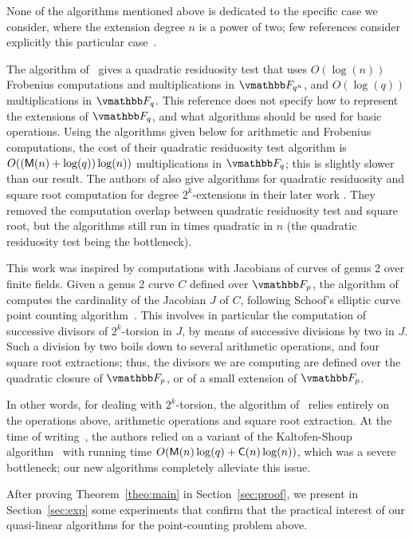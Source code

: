 None of the algorithms mentioned above is dedicated to the specific
case we consider, where the extension degree $n$ is a power of two;
few references consider explicitly this particular 
case~\cite{FeNoMo03, FeNoMo05}. 

The algorithm of~\cite{FeNoMo03} gives a quadratic residuosity test
that uses $O(\log(n))$ Frobenius computations and multiplications in
$\F_{q^n}$, and $O(\log(q))$ multiplications in $\F_q$. This reference
does not specify how to represent the extensions of $\F_q$, and what
algorithms should be used for basic operations.  Using the algorithms
given below for arithmetic and Frobenius computations, the cost of
their quadratic residuosity test algorithm is $O((\mathsf{M}(n) +
\log(q))\log(n))$ multiplications in $\F_q$; this is slightly slower
than our result.  The authors of \cite{FeNoMo03} also give algorithms
for quadratic residuosity and square root computation for degree
$2^k$-extensions in their later work \cite{FeNoMo05}. They removed the
computation overlap between quadratic residuosity test and square
root, but the algorithms still run in times quadratic in $n$ (the
quadratic residuosity test being the bottleneck).

\medskip

This work was inspired by computations with Jacobians of curves of
genus 2 over finite fields. Given a genus 2 curve $C$ defined over
$\F_p$, the algorithm of~\cite{GaSc12} computes the cardinality of the
Jacobian $J$ of $C$, following Schoof's elliptic curve point counting
algorithm~\cite{Schoof85}. This involves in particular the computation
of successive divisors of $2^k$-torsion in $J$, by means of successive
divisions by two in $J$. Such a division by two boils down to several
arithmetic operations, and four square root extractions; thus, the
divisors we are computing are defined over the quadratic closure of
$\F_p$, or of a small extension of $\F_p$.

In other words, for dealing with $2^k$-torsion, the algorithm
of~\cite{GaSc12} relies entirely on the operations above, arithmetic
operations and square root extraction. At the time of
writing~\cite{GaSc12}, the authors relied on a variant of the
Kaltofen-Shoup algorithm~\cite{KaltofenShoup1997} with running time
$O(\mathsf{M}(n)\log(q) + \mathsf{C}(n)\log(n))$, which was a severe bottleneck; our
new algorithms completely alleviate this issue.

\medskip

After proving Theorem~\ref{theo:main} in Section~\ref{sec:proof}, we
present in Section~\ref{sec:exp} some experiments that confirm that
the practical interest of our quasi-linear algorithms for the
point-counting problem above.

